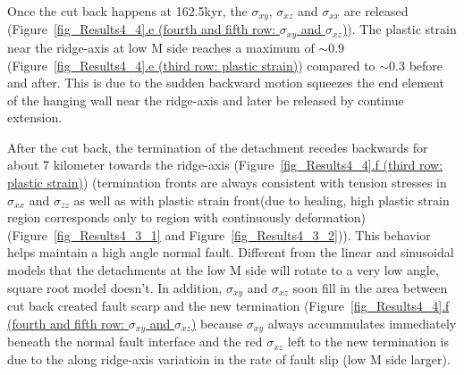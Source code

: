Once the cut back happens at 162.5kyr, the $\sigma_{xy}$, $\sigma_{xz}$ and $\sigma_{xx}$ are released (Figure~\hyperref[fig_Results4_4]{\ref{fig_Results4_4}.e (fourth and fifth row: $\sigma_{xy}$ and $\sigma_{xz}$)}). The plastic strain near the ridge-axis at low M side reaches a maximum of $\sim$0.9 (Figure~\hyperref[fig_Results4_4]{\ref{fig_Results4_4}.e (third row: plastic strain)}) compared to $\sim$0.3 before and after. This is due to the sudden backward motion squeezes the end element of the hanging wall near the ridge-axis and later be released by continue extension.

After the cut back, the termination of the detachment recedes backwards for about 7 kilometer towards the ridge-axis (Figure~\hyperref[fig_Results4_4]{\ref{fig_Results4_4}.f (third row: plastic strain)}) (termination fronts are always consistent with tension stresses in $\sigma_{xx}$ and $\sigma_{zz}$ as well as with plastic strain front(due to healing, high plastic strain region corresponds only to region with continuously deformation) (Figure~\hyperref[fig_Results4_3_1]{\ref{fig_Results4_3_1}} and Figure~\hyperref[fig_Results4_3_2]{\ref{fig_Results4_3_2}})). This behavior helps maintain a high angle normal fault. Different from the linear and sinusoidal models that the detachments at the low M side will rotate to a very low angle, square root model doesn't. In addition, $\sigma_{xy}$ and $\sigma_{xz}$ soon fill in the area between cut back created fault scarp and the new termination (Figure~\hyperref[fig_Results4_4]{\ref{fig_Results4_4}.f (fourth and fifth row: $\sigma_{xy}$ and $\sigma_{xz}$)} because $\sigma_{xy}$ always accummulates immediately beneath the normal fault interface and the red $\sigma_{xz}$ left to the new termination is due to the along ridge-axis variatioin in the rate of fault slip (low M side larger).  

